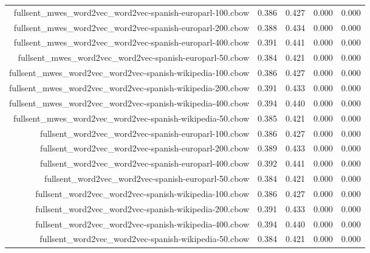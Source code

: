 \begin{figure*}
\begin{centering}
\begin{tabulary}{\textwidth}{|R|L|L|L|L|}
fullsent_mwes_word2vec_word2vec-spanish-europarl-100.cbow & 0.386 & 0.427 & 0.000 & 0.000 \\
fullsent_mwes_word2vec_word2vec-spanish-europarl-200.cbow & 0.388 & 0.434 & 0.000 & 0.000 \\
fullsent_mwes_word2vec_word2vec-spanish-europarl-400.cbow & 0.391 & 0.441 & 0.000 & 0.000 \\
fullsent_mwes_word2vec_word2vec-spanish-europarl-50.cbow & 0.384 & 0.421 & 0.000 & 0.000 \\
fullsent_mwes_word2vec_word2vec-spanish-wikipedia-100.cbow & 0.386 & 0.427 & 0.000 & 0.000 \\
fullsent_mwes_word2vec_word2vec-spanish-wikipedia-200.cbow & 0.391 & 0.433 & 0.000 & 0.000 \\
fullsent_mwes_word2vec_word2vec-spanish-wikipedia-400.cbow & 0.394 & 0.440 & 0.000 & 0.000 \\
fullsent_mwes_word2vec_word2vec-spanish-wikipedia-50.cbow & 0.385 & 0.421 & 0.000 & 0.000 \\
fullsent_word2vec_word2vec-spanish-europarl-100.cbow & 0.386 & 0.427 & 0.000 & 0.000 \\
fullsent_word2vec_word2vec-spanish-europarl-200.cbow & 0.389 & 0.433 & 0.000 & 0.000 \\
fullsent_word2vec_word2vec-spanish-europarl-400.cbow & 0.392 & 0.441 & 0.000 & 0.000 \\
fullsent_word2vec_word2vec-spanish-europarl-50.cbow & 0.384 & 0.421 & 0.000 & 0.000 \\
fullsent_word2vec_word2vec-spanish-wikipedia-100.cbow & 0.386 & 0.427 & 0.000 & 0.000 \\
fullsent_word2vec_word2vec-spanish-wikipedia-200.cbow & 0.391 & 0.433 & 0.000 & 0.000 \\
fullsent_word2vec_word2vec-spanish-wikipedia-400.cbow & 0.394 & 0.440 & 0.000 & 0.000 \\
fullsent_word2vec_word2vec-spanish-wikipedia-50.cbow & 0.384 & 0.421 & 0.000 & 0.000 \\
    \hline
    \hline


\end{tabulary}
\end{centering}
\end{figure*}
